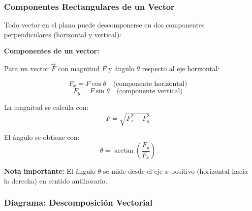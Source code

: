 \subsubsection{Componentes Rectangulares de un Vector}

\begin{seccion}
Todo vector en el plano puede descomponerse en dos componentes perpendiculares (horizontal y vertical):

\vspace{0.3cm}

\begin{ecuacion}
\textbf{Componentes de un vector:}

Para un vector $\vec{F}$ con magnitud $F$ y ángulo $\theta$ respecto al eje horizontal:

$$F_x = F \cos\theta \quad \text{(componente horizontal)}$$
$$F_y = F \sin\theta \quad \text{(componente vertical)}$$

La magnitud se calcula con:
$$F = \sqrt{F_x^2 + F_y^2}$$

El ángulo se obtiene con:
$$\theta = \arctan\left(\frac{F_y}{F_x}\right)$$
\end{ecuacion}

\begin{nota}
    \textbf{Nota importante:} El ángulo $\theta$ se mide desde el eje $x$ positivo (horizontal hacia la derecha) en sentido antihorario.
\end{nota}

\end{seccion}

\subsubsection{Diagrama: Descomposición Vectorial}

\begin{center}

\shorthandon{>}\shorthandon{<}
\end{center}

